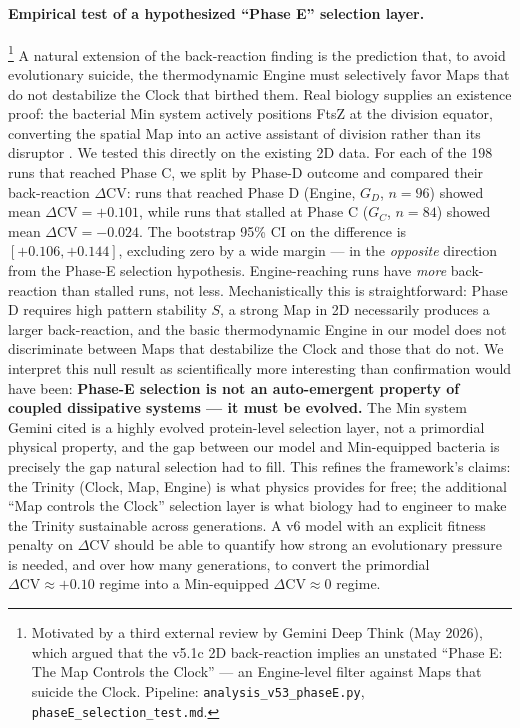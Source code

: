\documentclass[11pt,letterpaper]{article}
\begin{document}
\paragraph{Empirical test of a hypothesized ``Phase E'' selection layer.}\footnote{Motivated by a third external review by Gemini Deep Think (May 2026), which argued that the v5.1c 2D back-reaction implies an unstated ``Phase E: The Map Controls the Clock'' --- an Engine-level filter against Maps that suicide the Clock. Pipeline: \texttt{analysis\_v53\_phaseE.py}, \texttt{phaseE\_selection\_test.md}.} A natural extension of the back-reaction finding is the prediction that, to avoid evolutionary suicide, the thermodynamic Engine must selectively favor Maps that do not destabilize the Clock that birthed them. Real biology supplies an existence proof: the bacterial Min system actively positions FtsZ at the division equator, converting the spatial Map into an active assistant of division rather than its disruptor \citep{lutkenhaus2007min}. We tested this directly on the existing 2D data. For each of the 198 runs that reached Phase C, we split by Phase-D outcome and compared their back-reaction $\Delta\mathrm{CV}$: runs that reached Phase D (Engine, $G_D$, $n = 96$) showed mean $\Delta\mathrm{CV} = +0.101$, while runs that stalled at Phase C ($G_C$, $n = 84$) showed mean $\Delta\mathrm{CV} = -0.024$. The bootstrap 95\% CI on the difference is $[+0.106, +0.144]$, excluding zero by a wide margin --- in the \emph{opposite} direction from the Phase-E selection hypothesis. Engine-reaching runs have \emph{more} back-reaction than stalled runs, not less. Mechanistically this is straightforward: Phase D requires high pattern stability $S$, a strong Map in 2D necessarily produces a larger back-reaction, and the basic thermodynamic Engine in our model does not discriminate between Maps that destabilize the Clock and those that do not. We interpret this null result as scientifically more interesting than confirmation would have been: \textbf{Phase-E selection is not an auto-emergent property of coupled dissipative systems --- it must be evolved.} The Min system Gemini cited is a highly evolved protein-level selection layer, not a primordial physical property, and the gap between our model and Min-equipped bacteria is precisely the gap natural selection had to fill. This refines the framework's claims: the Trinity (Clock, Map, Engine) is what physics provides for free; the additional ``Map controls the Clock'' selection layer is what biology had to engineer to make the Trinity sustainable across generations. A v6 model with an explicit fitness penalty on $\Delta\mathrm{CV}$ should be able to quantify how strong an evolutionary pressure is needed, and over how many generations, to convert the primordial $\Delta\mathrm{CV} \approx +0.10$ regime into a Min-equipped $\Delta\mathrm{CV} \approx 0$ regime.
\end{document}
